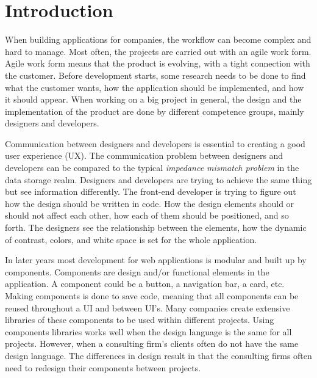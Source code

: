 \section{Introduction}



When building applications for companies, the workflow can become complex and hard to manage. Most often, the projects are carried out with an agile work form\cite{cohen2004introduction}. Agile work form means that the product is evolving, with a tight connection with the customer. Before development starts, some research needs to be done to find what the customer wants, how the application should be implemented, and how it should appear. When working on a big project in general, the design and the implementation of the product are done by different competence groups, mainly designers and developers. 

Communication between designers and developers is essential to creating a good user experience (UX). The communication problem between designers and developers can be compared to the typical \textit{impedance mismatch problem} in the data storage realm. Designers and developers are trying to achieve the same thing but see information differently. The front-end developer is trying to figure out how the design should be written in code. How the design elements should or should not affect each other, how each of them should be positioned, and so forth. The designers see the relationship between the elements, how the dynamic of contrast, colors, and white space is set for the whole application. 

In later years most development for web applications is modular and built up by \glspl{component}. Components are design and/or functional elements in the application. A component could be a button, a navigation bar, a card\cite{babichSimpleDesignTips2020}, etc. Making components is done to save code, meaning that all components can be reused throughout a UI and between UI's. Many companies create extensive libraries of these components to be used within different projects. Using components libraries works well when the design language is the same for all projects. However, when a consulting firm's clients often do not have the same design language. The differences in design result in that the consulting firms often need to redesign their components between projects. 



